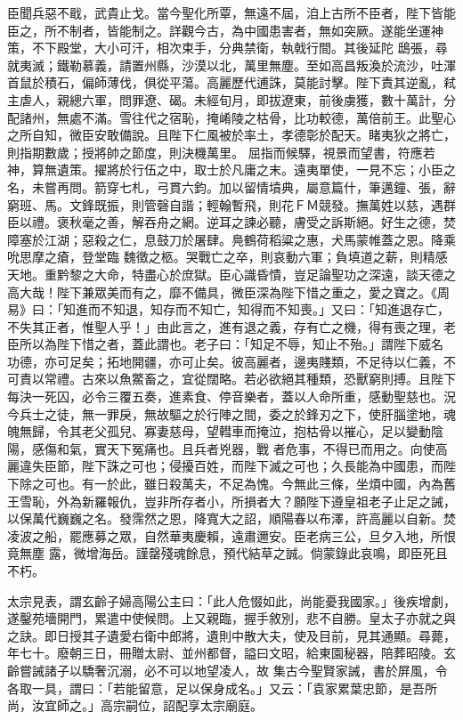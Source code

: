 \begin{pinyinscope}
 臣聞兵惡不戢，武貴止戈。當今聖化所覃，無遠不屆，洎上古所不臣者，陛下皆能臣之，所不制者，皆能制之。詳觀今古，為中國患害者，無如突厥。遂能坐運神策，不下殿堂，大小可汗，相次束手，分典禁衛，執戟行間。其後延陀
 鴟張，尋就夷滅；鐵勒慕義，請置州縣，沙漠以北，萬里無塵。至如高昌叛渙於流沙，吐渾首鼠於積石，偏師薄伐，俱從平蕩。高麗歷代逋誅，莫能討擊。陛下責其逆亂，弒主虐人，親總六軍，問罪遼、碣。未經旬月，即拔遼東，前後虜獲，數十萬計，分配諸州，無處不滿。雪往代之宿恥，掩崤陵之枯骨，比功較德，萬倍前王。此聖心之所自知，微臣安敢備說。且陛下仁風被於率土，孝德彰於配天。睹夷狄之將亡，則指期數歲；授將帥之節度，則決機萬里。
 屈指而候驛，視景而望書，符應若神，算無遺策。擢將於行伍之中，取士於凡庸之末。遠夷單使，一見不忘；小臣之名，未嘗再問。箭穿七札，弓貫六鈞。加以留情墳典，屬意篇什，筆邁鐘、張，辭窮班、馬。文鋒既振，則管磬自諧；輕翰暫飛，則花ＦＭ競發。撫萬姓以慈，遇群臣以禮。褒秋毫之善，解吞舟之網。逆耳之諫必聽，膚受之訴斯絕。好生之德，焚障塞於江湖；惡殺之仁，息鼓刀於屠肆。鳧鶴荷稻粱之惠，犬馬蒙帷蓋之恩。降乘吮思摩之瘡，登堂臨
 魏徵之柩。哭戰亡之卒，則哀動六軍；負填道之薪，則精感天地。重黔黎之大命，特盡心於庶獄。臣心識昏憒，豈足論聖功之深遠，談天德之高大哉！陛下兼眾美而有之，靡不備具，微臣深為陛下惜之重之，愛之寶之。《周易》曰：「知進而不知退，知存而不知亡，知得而不知喪。」又曰：「知進退存亡，不失其正者，惟聖人乎！」由此言之，進有退之義，存有亡之機，得有喪之理，老臣所以為陛下惜之者，蓋此謂也。老子曰：「知足不辱，知止不殆。」謂陛下威名
 功德，亦可足矣；拓地開疆，亦可止矣。彼高麗者，邊夷賤類，不足待以仁義，不可責以常禮。古來以魚鱉畜之，宜從闊略。若必欲絕其種類，恐獸窮則搏。且陛下每決一死囚，必令三覆五奏，進素食、停音樂者，蓋以人命所重，感動聖慈也。況今兵士之徒，無一罪戾，無故驅之於行陣之間，委之於鋒刃之下，使肝腦塗地，魂魄無歸，令其老父孤兒、寡妻慈母，望轊車而掩泣，抱枯骨以摧心，足以變動陰陽，感傷和氣，實天下冤痛也。且兵者兇器，戰
 者危事，不得已而用之。向使高麗違失臣節，陛下誅之可也；侵擾百姓，而陛下滅之可也；久長能為中國患，而陛下除之可也。有一於此，雖日殺萬夫，不足為愧。今無此三條，坐煩中國，內為舊王雪恥，外為新羅報仇，豈非所存者小，所損者大？願陛下遵皇祖老子止足之誡，以保萬代巍巍之名。發霈然之恩，降寬大之詔，順陽春以布澤，許高麗以自新。焚凌波之船，罷應募之眾，自然華夷慶賴，遠肅邇安。臣老病三公，旦夕入地，所恨竟無塵
 露，微增海岳。謹罄殘魂餘息，預代結草之誠。倘蒙錄此哀鳴，即臣死且不朽。



 太宗見表，謂玄齡子婦高陽公主曰：「此人危惙如此，尚能憂我國家。」後疾增劇，遂鑿苑墻開門，累遣中使候問。上又親臨，握手敘別，悲不自勝。皇太子亦就之與之訣。即日授其子遺愛右衛中郎將，遺則中散大夫，使及目前，見其通顯。尋薨，年七十。廢朝三日，冊贈太尉、並州都督，謚曰文昭，給東園秘器，陪葬昭陵。玄齡嘗誡諸子以驕奢沉溺，必不可以地望凌人，故
 集古今聖賢家誡，書於屏風，令各取一具，謂曰：「若能留意，足以保身成名。」又云：「袁家累葉忠節，是吾所尚，汝宜師之。」高宗嗣位，詔配享太宗廟庭。




\end{pinyinscope}
